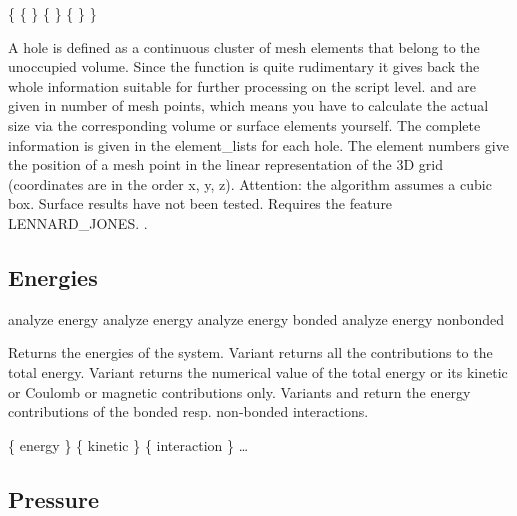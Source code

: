 \begin{code}
\{     
    \{  \}
    \{  \} 
    \{  \} 
\} 
\end{code}

A hole is defined as a continuous cluster of mesh elements that belong
to the unoccupied volume. Since the function is quite rudimentary it
gives back the whole information suitable for further processing on
the script level.  and  are given in number
of mesh points, which means you have to calculate the actual size via
the corresponding volume or surface elements yourself. The complete
information is given in the element_lists for each hole. The element
numbers give the position of a mesh point in the linear representation
of the 3D grid (coordinates are in the order x, y, z). Attention: the
algorithm assumes a cubic box. Surface results have not been tested.
Requires the feature LENNARD_JONES.  .

\subsection{Energies}
\label{analyze:energy}

\begin{essyntax}
   analyze energy
   analyze energy 
   analyze energy bonded 
   analyze energy nonbonded  
\end{essyntax}
Returns the energies of the system. Variant  returns all
the contributions to the total energy. Variant  returns the
numerical value of the total energy or its kinetic or Coulomb or magnetic
contributions only. Variants  and  return the
energy contributions of the bonded resp. non-bonded interactions.

\begin{code}
\{ energy  \} \{ kinetic  \} \{ interaction  \} \dots 
\end{code}


\subsection{Pressure}
\label{analyze:pressure}

